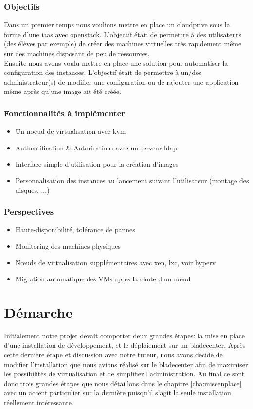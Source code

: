 \documentclass[a4paper,oneside]{report}
\begin{document}
\subsubsection{Objectifs}
Dans un premier temps nous voulions mettre en place un \gls{cloudprive} sous la forme d'une \gls{iaas} avec \gls{openstack}.
L'objectif était de permettre à des utilisateurs (des élèves par exemple) de créer des machines virtuelles très rapidement même sur des machines disposant de peu de ressources.\\

Ensuite nous avons voulu mettre en place une solution pour automatiser la configuration des instances.
L'objectif était de permettre à un/des administrateur(s) de modifier une configuration ou de rajouter une application même après qu'une image ait été créée.

\subsubsection{Fonctionnalités à implémenter}
\begin{itemize}
\item Un noeud de \gls{virtualisation} avec \gls{kvm}
\item Authentification \& Autorisations avec un serveur \gls{ldap}
\item Interface simple d'utilisation pour la création d'images
\item Personnalisation des instances au lancement suivant l'utilisateur (montage des disques, ...)
\end{itemize}

\subsubsection{Perspectives}
\begin{itemize}
\item Haute-disponibilité, tolérance de pannes
\item Monitoring des machines physiques
\item Nœuds de \gls{virtualisation} supplémentaires avec \gls{xen}, \gls{lxc}, voir \gls{hyperv}
\item Migration automatique des VMs après la chute d'un nœud
\end{itemize}

\section{Démarche}
Initialement notre projet devait comporter deux grandes étapes: la mise en place d'une installation de développement, et le déploiement sur un \gls{bladecenter}. Après cette dernière étape et discussion avec notre tuteur, nous avons décidé de modifier l'installation que nous avions réalisé sur le \gls{bladecenter} afin de maximiser les possibilités de \gls{virtualisation} et de simplifier l'administration.\newline
Au final ce sont donc trois grandes étapes que nous détaillons dans le chapitre \ref{cha:miseenplace} avec un accent particulier sur la dernière puisqu'il s'agit la seule installation réellement intéressante.
\end{document}
